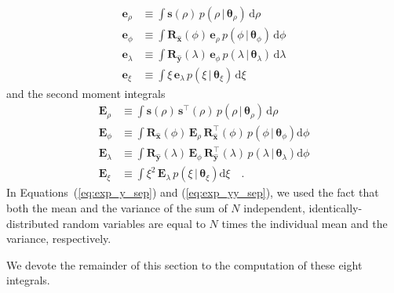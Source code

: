 \documentclass[modern]{aastex62}
\begin{document}
%
\begin{align}
    \label{eq:e1}
    \mathbf{e}_\rho
     & \equiv
    \int
    \mathbf{s}(\rho) \,
    p(\rho \, \big| \, \pmb{\theta}_{\rho}) \,
    \mathrm{d}\rho
    \\[1em]
    \label{eq:e2}
    \mathbf{e}_\phi
     & \equiv
    \int
    \mathbf{R}_{\hat{\mathbf{x}}}(\phi) \,
    \mathbf{e}_\rho \,
    p(\phi \, \big| \, \pmb{\theta}_{\phi}) \,
    \mathrm{d}\phi
    \\[1em]
    \label{eq:e3}
    \mathbf{e}_\lambda
     & \equiv
    \int
    \mathbf{R}_{\hat{\mathbf{y}}}(\lambda) \,
    \mathbf{e}_\phi \,
    p(\lambda \, \big| \, \pmb{\theta}_{\lambda}) \,
    \mathrm{d}\lambda
    \\[1em]
    \label{eq:e4}
    \mathbf{e}_\xi
     & \equiv
    \int
    \xi \,
    \mathbf{e}_\lambda \,
    p(\xi \, \big| \, \pmb{\theta}_{\xi}) \,
    \mathrm{d}\xi
\end{align}
%
and the second moment integrals
%
\begin{align}
    \label{eq:E1}
    \mathbf{E}_\rho
     & \equiv
    \int
    \mathbf{s}(\rho) \, \mathbf{s}^\top(\rho) \,
    p(\rho \, \big| \, \pmb{\theta}_{\rho}) \,
    \mathrm{d}\rho
    \\[1em]
    \label{eq:E2}
    \mathbf{E}_\phi
     & \equiv
    \int
    \mathbf{R}_{\hat{\mathbf{x}}}(\phi) \,
    \mathbf{E}_\rho \,
    \mathbf{R}_{\hat{\mathbf{x}}}^\top(\phi) \,
    p(\phi \, \big| \, \pmb{\theta}_{\phi})
    \mathrm{d}\phi
    \\[1em]
    \label{eq:E3}
    \mathbf{E}_\lambda
     & \equiv
    \int
    \mathbf{R}_{\hat{\mathbf{y}}}(\lambda) \,
    \mathbf{E}_\phi \,
    \mathbf{R}_{\hat{\mathbf{y}}}^\top(\lambda) \,
    p(\lambda \, \big| \, \pmb{\theta}_{\lambda})
    \mathrm{d}\phi
    \\[1em]
    \label{eq:E4}
    \mathbf{E}_\xi
     & \equiv
    \int
    \xi^2 \,
    \mathbf{E}_\lambda \,
    p(\xi \, \big| \, \pmb{\theta}_\xi)
    \mathrm{d}\xi
    \quad.
\end{align}
%
In Equations~(\ref{eq:exp_y_sep}) and (\ref{eq:exp_yy_sep}), we used the fact
that both the mean and the variance of the sum of $N$
independent, identically-distributed random variables are equal to $N$
times the individual mean and the variance, respectively.

We devote the remainder of this section to the computation of these eight
integrals.
\end{document}
